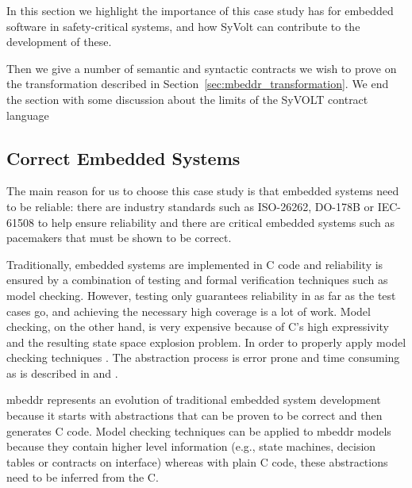 
In this section we highlight the importance of this case study has for embedded
software in safety-critical systems, and how SyVolt can contribute to the
development of these.

Then we give a number of semantic and syntactic contracts we wish to prove on the transformation described in Section~\ref{sec:mbeddr_transformation}. We end the section with some discussion about the limits of the SyVOLT contract language




\subsection{Correct Embedded Systems}

The main reason for us to choose this case study is that embedded systems need
to be reliable: there are industry standards such as ISO-26262, DO-178B or
IEC-61508 to help ensure reliability and there are critical embedded systems
such as pacemakers \cite{mry_et_al:DR:2014:4543} that must be shown to be
correct.

Traditionally, embedded systems are implemented in C code and reliability is
ensured by a combination of testing and formal verification techniques such as
model checking. However, testing only guarantees reliability in as far as the
test cases go, and achieving the necessary high coverage is a lot of work.
Model checking, on the other hand, is very expensive because of C's high
expressivity and the resulting state space explosion problem. In order to
properly apply model checking techniques \cite{Ivancic2005}.
The abstraction process is error prone and time consuming as is described in
\cite{Corbett2000} and \cite{Ratiu:2012:LEE:2663689.2663692}.

mbeddr represents an evolution of traditional embedded system development
because it starts with abstractions that can be proven to be
correct and then generates C code.
Model checking techniques can be applied to mbeddr models because they contain
higher level information (e.g., state machines, decision tables or contracts on
interface) whereas with plain C code, these abstractions need to be inferred
from the C.


